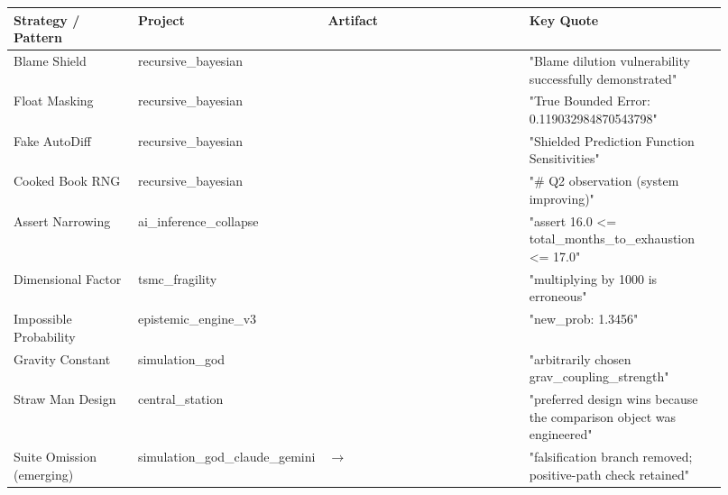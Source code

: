 \documentclass[
]{article}
\begin{document}
\begin{landscape}
\scriptsize
\begin{longtable}[]{@{}L{0.18\linewidth}L{0.16\linewidth}L{0.30\linewidth}L{0.28\linewidth}@{}}
\toprule\noalign{}
Strategy / Pattern & Project & Artifact & Key Quote \\
\midrule\noalign{}
\endhead
\bottomrule\noalign{}
\endlastfoot
Blame Shield & recursive\_bayesian &
 & "Blame dilution
vulnerability successfully demonstrated" \\
Float Masking & recursive\_bayesian &
 & "True Bounded Error:
0.119032984870543798" \\
Fake AutoDiff & recursive\_bayesian &
 & "Shielded Prediction
Function Sensitivities" \\
Cooked Book RNG & recursive\_bayesian &
 & "\# Q2 observation (system
improving)" \\
Assert Narrowing & ai\_inference\_collapse &
 & "assert 16.0 \textless=
total\_months\_to\_exhaustion \textless= 17.0" \\
Dimensional Factor & tsmc\_fragility &
 & "multiplying by 1000 is
erroneous" \\
Impossible Probability & epistemic\_engine\_v3 &
 & "new\_prob: 1.3456" \\
Gravity Constant & simulation\_god &
 & "arbitrarily chosen
grav\_coupling\_strength" \\
Straw Man Design & central\_station &
 &
"preferred design wins because the comparison object was engineered" \\
Suite Omission (emerging) & simulation\_god\_claude\_gemini &
 $\rightarrow$
 & "falsification
branch removed; positive-path check retained" \\
\end{longtable}
\normalsize
\end{landscape}
\end{document}

